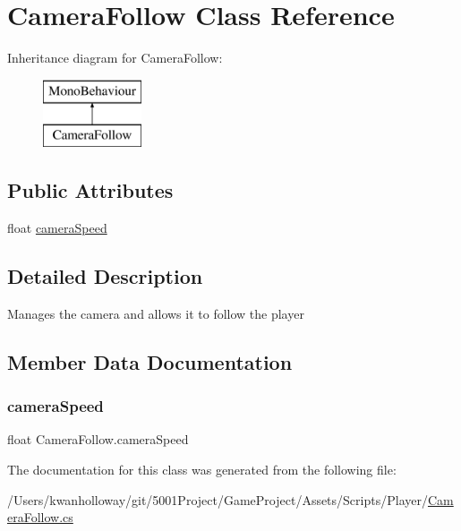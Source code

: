 \hypertarget{class_camera_follow}{}\section{Camera\+Follow Class Reference}
\label{class_camera_follow}
Inheritance diagram for Camera\+Follow\+:\begin{figure}[H]
\begin{center}
\leavevmode
\includegraphics[height=2.000000cm]{class_camera_follow}
\end{center}
\end{figure}
\subsection*{Public Attributes}
\begin{DoxyCompactItemize}
\item 
float \hyperlink{class_camera_follow_a1bc45f6500779db9197b6620308a3589}{camera\+Speed}
\end{DoxyCompactItemize}


\subsection{Detailed Description}
Manages the camera and allows it to follow the player 

\subsection{Member Data Documentation}
\mbox{\label{class_camera_follow_a1bc45f6500779db9197b6620308a3589}} 
\subsubsection{\texorpdfstring{camera\+Speed}{cameraSpeed}}
{\footnotesize\ttfamily float Camera\+Follow.\+camera\+Speed}



The documentation for this class was generated from the following file\+:\begin{DoxyCompactItemize}
\item 
/\+Users/kwanholloway/git/5001\+Project/\+Game\+Project/\+Assets/\+Scripts/\+Player/\hyperlink{_camera_follow_8cs}{Camera\+Follow.\+cs}\end{DoxyCompactItemize}
